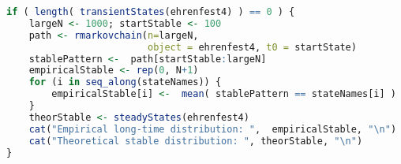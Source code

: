 \begin{description}
\begin{lstlisting}[language=R]
if ( length( transientStates(ehrenfest4) ) == 0 ) {
    largeN <- 1000; startStable <- 100
    path <- rmarkovchain(n=largeN,
                         object = ehrenfest4, t0 = startState)
    stablePattern <-  path[startStable:largeN]
    empiricalStable <- rep(0, N+1)
    for (i in seq_along(stateNames)) { 
        empiricalStable[i] <-  mean( stablePattern == stateNames[i] )
    }
    theorStable <- steadyStates(ehrenfest4)
    cat("Empirical long-time distribution: ",  empiricalStable, "\n")
    cat("Theoretical stable distribution: ", theorStable, "\n")
}


  
\end{lstlisting}













\end{description}



